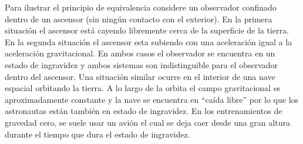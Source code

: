 Para ilustrar el principio de equivalencia considere un observador confinado dentro de un ascensor (sin ningún contacto con el exterior). En la primera situación el ascensor está cayendo libremente cerca de la superficie de la tierra. En la segunda situación el ascensor esta subiendo con una aceleración igual a la aceleración gravitacional. En ambos casos el observador se encuentra en un estado de ingravidez y ambos sistemas son indistinguible para el observador dentro del ascensor. Una situación similar ocurre en el interior de una nave espacial orbitando la tierra. A lo largo de la orbita el campo gravitacional es aproximadamente constante y la nave se encuentra en ``caída libre'' por lo que los astronautas están también en estado de ingravidez. En los entrenamientos de gravedad cero, se suele usar un avión el cual se deja caer desde una gran altura durante el tiempo que dura el estado de ingravidez. 




